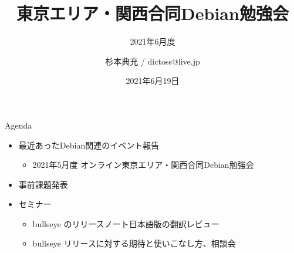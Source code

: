 \title{東京エリア・関西合同Debian勉強会}
\subtitle{2021年6月度} %
\author{杉本典充 / dictoss@live.jp}
\date{2021年6月19日}



\begin{frame}
\titlepage{}
\end{frame}

\begin{frame}{Agenda}
 \begin{minipage}[t]{0.45\hsize}
  \begin{itemize}
  \item 最近あったDebian関連のイベント報告
    \begin{itemize}
    \item 2021年5月度 オンライン東京エリア・関西合同Debian勉強会
    \end{itemize}
  \item 事前課題発表
  \end{itemize}
 \end{minipage}
 \begin{minipage}[t]{0.45\hsize}
   \begin{itemize}
   \item セミナー
     \begin{itemize}
      \item bullseye のリリースノート日本語版の翻訳レビュー
      \item bullseye リリースに対する期待と使いこなし方、相談会
     \end{itemize}
  \end{itemize}
 \end{minipage}
\end{frame}

